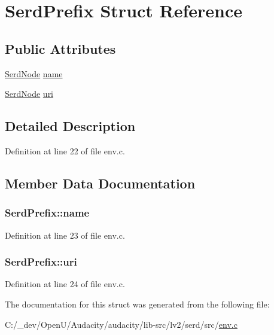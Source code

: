 \hypertarget{struct_serd_prefix}{}\section{Serd\+Prefix Struct Reference}
\label{struct_serd_prefix}
\subsection*{Public Attributes}
\begin{DoxyCompactItemize}
\item 
\hyperlink{struct_serd_node}{Serd\+Node} \hyperlink{struct_serd_prefix_a70ba00208de7d0ab87c36ffdd6662b0f}{name}
\item 
\hyperlink{struct_serd_node}{Serd\+Node} \hyperlink{struct_serd_prefix_af78e907ef544ac4e8937940852c29f78}{uri}
\end{DoxyCompactItemize}


\subsection{Detailed Description}


Definition at line 22 of file env.\+c.



\subsection{Member Data Documentation}
\subsubsection[{\texorpdfstring{name}{name}}]{ Serd\+Prefix\+::name}\hypertarget{struct_serd_prefix_a70ba00208de7d0ab87c36ffdd6662b0f}{}\label{struct_serd_prefix_a70ba00208de7d0ab87c36ffdd6662b0f}


Definition at line 23 of file env.\+c.

\subsubsection[{\texorpdfstring{uri}{uri}}]{ Serd\+Prefix\+::uri}\hypertarget{struct_serd_prefix_af78e907ef544ac4e8937940852c29f78}{}\label{struct_serd_prefix_af78e907ef544ac4e8937940852c29f78}


Definition at line 24 of file env.\+c.



The documentation for this struct was generated from the following file\+:\begin{DoxyCompactItemize}
\item 
C\+:/\+\_\+dev/\+Open\+U/\+Audacity/audacity/lib-\/src/lv2/serd/src/\hyperlink{env_8c}{env.\+c}\end{DoxyCompactItemize}
